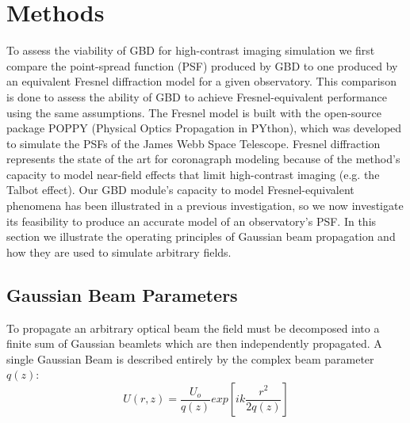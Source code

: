 \section{Methods}
\label{sect:methods}  %

To assess the viability of GBD for high-contrast imaging simulation we first compare the point-spread function (PSF) produced by GBD to one produced by an equivalent Fresnel diffraction model for a given observatory. This comparison is done to assess the ability of GBD to achieve Fresnel-equivalent performance using the same assumptions. The Fresnel model is built with the open-source package POPPY (Physical Optics Propagation in PYthon), which was developed to simulate the PSFs of the James Webb Space Telescope\cite{Perrin12}. Fresnel diffraction represents the state of the art for coronagraph modeling because of the method's capacity to model near-field effects that limit high-contrast imaging (e.g. the Talbot effect\cite{goodman17}). Our GBD module's capacity to model Fresnel-equivalent phenomena\cite{Ashcraft2020} has been illustrated in a previous investigation, so we now investigate its feasibility to produce an accurate model of an observatory's PSF. In this section we illustrate the operating principles of Gaussian beam propagation and how they are used to simulate arbitrary fields.


\subsection{Gaussian Beam Parameters}
To propagate an arbitrary optical beam the field must be decomposed into a finite sum of Gaussian beamlets which are then independently propagated. A single Gaussian Beam is described entirely by the complex beam parameter $q(z)$: \cite{goodman17}
\begin{equation}
	U(r,z) = \frac{U_o}{q(z)}exp[ik\frac{r^2}{2q(z)}]
\end{equation}

